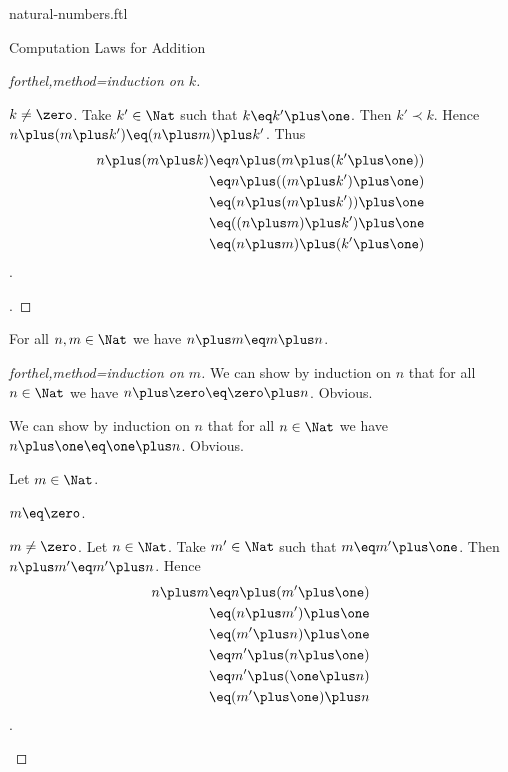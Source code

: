 \documentclass{naproche-library}
\begin{document}
\begin{smodule}[title=Natural Numbers]{natural-numbers.ftl}
\begin{sfragment}{Computation Laws for Addition}
\begin{proof}[forthel,method=induction on $k$]
    \begin{case}{$k\neq\zero$.}
      Take $k'\in\Nat$ such that $k\eq k'\plus\one$.
      Then $k'\prec k$.
      Hence $n\plus(m\plus k')\eq(n\plus m)\plus k'$.
      Thus
      \begin{align*}
        n\plus(m\plus k)
          &\eq n\plus(m\plus(k'\plus\one))\\
          &\eq n\plus((m\plus k')\plus\one)\\
          &\eq (n\plus(m\plus k'))\plus\one\\
          &\eq ((n\plus m)\plus k')\plus\one\\
          &\eq (n\plus m)\plus(k'\plus\one)
      \end{align*}.
    \end{case}.
  \end{proof}

  \begin{proposition}[forthel,title=Commutativity,id=PlusIsCommutativeProp]
    For all $n,m\in\Nat$ we have $n\plus m\eq m\plus n$.
  \end{proposition}
  \begin{proof}[forthel,method=induction on $m$]
    We can show by induction on $n$ that for all $n\in\Nat$ we have $n\plus\zero\eq\zero\plus n$.
    Obvious.

    We can show by induction on $n$ that for all $n\in\Nat$ we have $n\plus\one\eq\one\plus n$.
    Obvious.

    Let $m\in\Nat$.

    \begin{case}{$m\eq\zero$.} \end{case}

    \begin{case}{$m\neq\zero$.}
      Let $n\in\Nat$.
      Take $m'\in\Nat$ such that $m\eq m'\plus\one$.
      Then $n\plus m'\eq m'\plus n$.
      Hence
      \begin{align*}
        n\plus m
          &\eq n\plus(m'\plus\one)\\
          &\eq (n\plus m')\plus\one\\
          &\eq (m'\plus n)\plus\one\\
          &\eq m'\plus(n\plus\one)\\
          &\eq m'\plus(\one\plus n)\\
          &\eq (m'\plus\one)\plus n
      \end{align*}.
    \end{case}
  \end{proof}


\end{sfragment}
\end{smodule}
\end{document}
